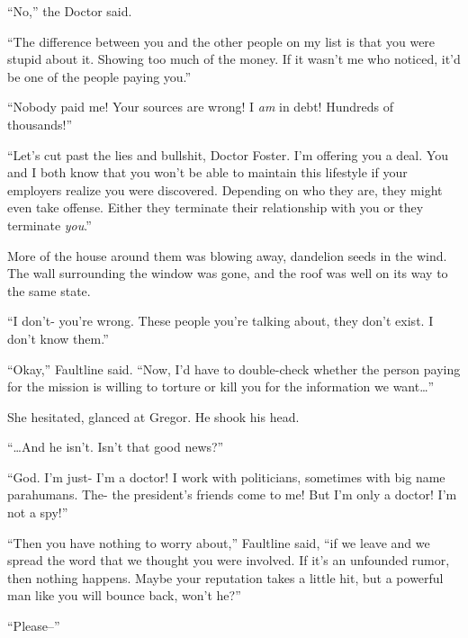 ``No,'' the Doctor said.



``The difference between you and the other people on my list is that you were stupid about it.  Showing too much of the money.  If it wasn't me who noticed, it'd be one of the people paying you.''



``Nobody paid me!  Your sources are wrong!  I \emph{am} in debt!  Hundreds of thousands!''



``Let's cut past the lies and bullshit, Doctor Foster.  I'm offering you a deal.  You and I both know that you won't be able to maintain this lifestyle if your employers realize you were discovered.  Depending on who they are, they might even take offense.  Either they terminate their relationship with you or they terminate \emph{you}.''



More of the house around them was blowing away, dandelion seeds in the wind.  The wall surrounding the window was gone, and the roof was well on its way to the same state.



``I don't- you're wrong.  These people you're talking about, they don't exist.  I don't know them.''



``Okay,'' Faultline said.  ``Now, I'd have to double-check whether the person paying for the mission is willing to torture or kill you for the information we want\ldots''



She hesitated, glanced at Gregor.  He shook his head.



``\ldots{}And he isn't.  Isn't that good news?''



``God.  I'm just- I'm a doctor!  I work with politicians, sometimes with big name parahumans.  The- the president's friends come to me!  But I'm only a doctor!  I'm not a spy!''



``Then you have nothing to worry about,'' Faultline said, ``if we leave and we spread the word that we thought you were involved.  If it's an unfounded rumor, then nothing happens.  Maybe your reputation takes a little hit, but a powerful man like you will bounce back, won't he?''



``Please--''



